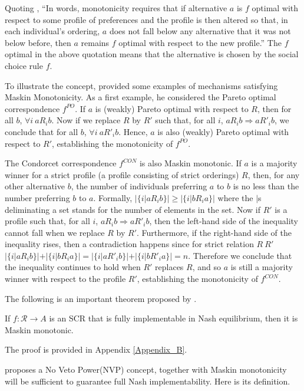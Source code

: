 Quoting \parencite{Maskin1999}, ``In words, monotonicity requires that if alternative $a$ is $f$ optimal with respect to some
profile of preferences and the profile is then altered so that, in each individual’s ordering,
$a$ does not fall below any alternative that it was not below before, then $a$ remains $f$ 
optimal with respect to the new profile.'' The $f$ optimal in the above quotation means that the alternative is chosen by the social choice rule $f$.

To illustrate the concept, \parencite{Maskin1999} provided some examples of
mechanisms satisfying Maskin Monotonicity. As a first example, he considered the Pareto optimal correspondence $f^{PO}$. 
If $a$ is (weakly) Pareto optimal with respect to $R$, then for all $b$,  $\forall i \ a R_i b$. Now if we replace $R$ by $R'$ such that, for all $i$, $a R_i b \Rightarrow  a R'_i b$, we conclude that
for all $b$, $\forall i \ a R'_i b$. Hence, $a$ is also (weakly) Pareto optimal with respect to $R'$,  establishing the monotonicity of $f^{PO}$.

The Condorcet correspondence $f^{CON}$ is also Maskin monotonic. If $a$ is a majority winner
for a strict profile (a profile consisting of strict orderings) $R$, then, for any other alternative
$b$, the number of individuals preferring $a$ to $b$ is no less than the number preferring $b$ to
$a$. Formally, 
$ |\{i|a R_i b\}| \geq |\{i|b R_i a\}| $ where the $|$s deliminating a set stands for the number of elements in the set.
Now if $R'$ is a profile such that, for all $i$, $a R_i b \Rightarrow a R'_i b$, then the left-hand side of the inequality cannot
fall when we replace $R$ by $R'$. Furthermore, if the right-hand side of the inequality rises, then a contradiction happens since for strict relation 
$R\ R'$ $|\{i|a R_i b\}| + |\{i|b R_i a\}|= |\{i|a R'_i b\}| + |\{i|b R'_i a\}|= n $. Therefore we conclude that the inequality continues to hold when $R'$ replaces $R$, and
so $a$ is still a majority winner with respect to the profile $R'$, establishing the monotonicity of $f^{CON}$.


The following  is an important theorem proposed by \parencite{Maskin1999}.

\begin{thm*}
If $f: \mathscr{R} \rightarrow A$ is an SCR that is fully implementable in
Nash equilibrium, then it is Maskin monotonic.
\end{thm*}
The proof is provided in Appendix \ref{Appendix_B}.

\parencite{Maskin1999} proposes a No Veto Power(NVP) concept, together with
Maskin monotonicity will be sufficient to guarantee full Nash
implementability. Here is its definition.

